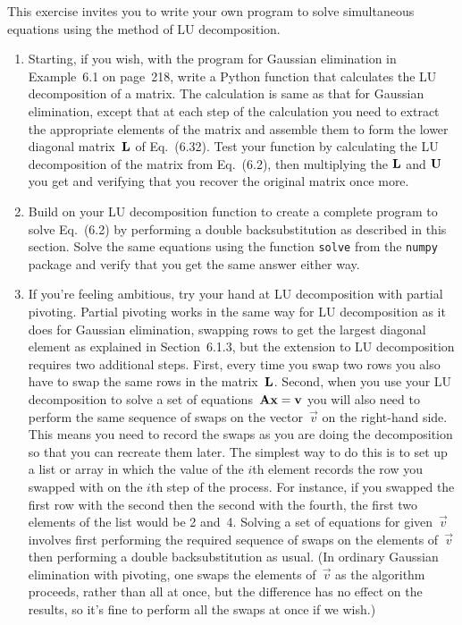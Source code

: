 \documentclass[12pt]{article}
\begin{document}
\begin{exercises}
\exskip This exercise invites you to write your own
program to solve simultaneous equations using the method of LU
decomposition.
\begin{enumerate}\setlength{\itemsep}{0pt}
\item Starting, if you wish, with the program for Gaussian elimination in
  Example~6.1 on page~218, write a Python function that calculates the LU
  decomposition of a matrix.  The calculation is same as that for Gaussian
  elimination, except that at each step of the calculation you need to
  extract the appropriate elements of the matrix and assemble them to form
  the lower diagonal matrix~$\mathbf{L}$ of Eq.~(6.32).  Test your function by
  calculating the LU decomposition of the matrix from Eq.~(6.2), then
  multiplying the $\mathbf{L}$ and $\mathbf{U}$ you get and verifying that you
  recover the original matrix once more.
\item Build on your LU decomposition function to create a complete program
  to solve Eq.~(6.2) by performing a double backsubstitution as described
  in this section.  Solve the same equations using the function
  \verb|solve| from the \verb|numpy| package and verify that you get the
  same answer either way.
\item If you're feeling ambitious, try your hand at LU decomposition with
  partial pivoting.  Partial pivoting works in the same way for LU
  decomposition as it does for Gaussian elimination, swapping rows to get
  the largest diagonal element as explained in Section~6.1.3, but the
  extension to LU decomposition requires two additional steps.  First,
  every time you swap two rows you also have to swap the same rows in the
  matrix~$\mathbf{L}$.  Second, when you use your LU decomposition to solve a
  set of equations~$\mathbf{A}\mathbf{x}=\mathbf{v}$ you will also need to perform
  the same sequence of swaps on the vector~$\vec{v}$ on the right-hand
  side.  This means you need to record the swaps as you are doing the
  decomposition so that you can recreate them later.  The simplest way to
  do this is to set up a list or array in which the value of the $i$th
  element records the row you swapped with on the $i$th step of the
  process.  For instance, if you swapped the first row with the second then
  the second with the fourth, the first two elements of the list would be 2
  and~4.  Solving a set of equations for given~$\vec{v}$ involves first
  performing the required sequence of swaps on the elements of~$\vec{v}$
  then performing a double backsubstitution as usual.  (In ordinary
  Gaussian elimination with pivoting, one swaps the elements of~$\vec{v}$
  as the algorithm proceeds, rather than all at once, but the difference
  has no effect on the results, so it's fine to perform all the swaps at
  once if we wish.)


\end{enumerate}
\end{exercises}
\end{document}

